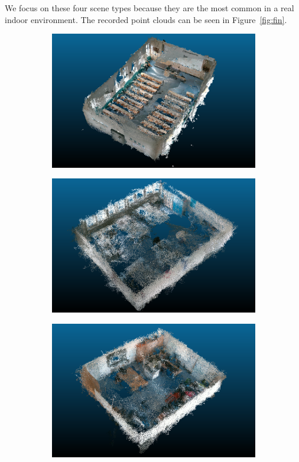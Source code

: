 \documentclass[main.tex]{subfiles}
\begin{document}
We focus on these four scene types because they are the most common in a real indoor environment.
The recorded point clouds can be seen in Figure~\ref{fig:fin}.


\begin{figure}[H]
    \begin{subfigure}{0.5\textwidth}
        \centering
        \includegraphics[width=.9\linewidth]{images/307.png}
        \caption[Dynamic Dataset - auditorium]{}
        \label{fig:fin307}
    \end{subfigure}
    \begin{subfigure}{0.5\textwidth}
        \centering
        \includegraphics[width=.9\linewidth]{images/333.png}
        \caption[Dynamic Dataset - conference room]{}
        \label{fig:fin333}
    \end{subfigure}
    \begin{subfigure}{0.5\textwidth}
        \centering
        \includegraphics[width=0.9\linewidth]{images/425.png}

\end{subfigure}
\end{figure}
\end{document}

